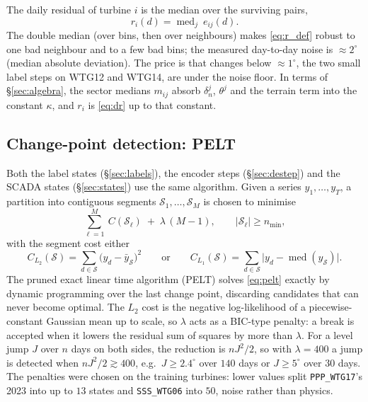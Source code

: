 \documentclass[11pt,a4paper]{article}
\theoremstyle{remark}
\newcommand{\med}{\operatorname{med}}
\newcommand{\dg}{^{\circ}}
\newcommand{\code}[1]{\texttt{#1}}
\begin{document}
The daily residual of turbine $i$ is the median over the surviving pairs,
\begin{equation}
  r_i(d) = \med_{j}\ e_{ij}(d) .
  \label{eq:r_def}
\end{equation}
The double median (over bins, then over neighbours) makes \eqref{eq:r_def}
robust to one bad neighbour and to a few bad bins; the measured day-to-day
noise is $\approx2\dg$ (median absolute deviation). The price is that changes
below $\approx1\dg$, the two small label steps on WTG12 and WTG14, are under the
noise floor. In terms of \S\ref{sec:algebra}, the sector medians $m_{ij}$
absorb $\delta_n^j$, $\theta^j$ and the terrain term into the constant $\kappa$,
and $r_i$ is \eqref{eq:dr} up to that constant.

\subsection{Change-point detection: PELT}\label{sec:pelt}
Both the label states (\S\ref{sec:labels}), the encoder steps
(\S\ref{sec:destep}) and the SCADA states (\S\ref{sec:states}) use the same
algorithm. Given a series $y_1,\dots,y_T$, a partition into contiguous segments
$\mathcal S_1,\dots,\mathcal S_M$ is chosen to minimise
\begin{equation}
  \sum_{\ell=1}^{M}\ C(\mathcal S_\ell) \;+\; \lambda\,(M-1),
  \qquad |\mathcal S_\ell| \ge n_{\min},
  \label{eq:pelt}
\end{equation}
with the segment cost either
\begin{equation}
  C_{L_2}(\mathcal S) = \sum_{d\in\mathcal S}\big(y_d - \bar y_{\mathcal S}\big)^2
  \qquad\text{or}\qquad
  C_{L_1}(\mathcal S) = \sum_{d\in\mathcal S}\big|y_d - \med(y_{\mathcal S})\big| .
\end{equation}
The pruned exact linear time algorithm (PELT) solves \eqref{eq:pelt} exactly by
dynamic programming over the last change point, discarding candidates that can
never become optimal. The $L_2$ cost is the negative log-likelihood of a
piecewise-constant Gaussian mean up to scale, so $\lambda$ acts as a BIC-type
penalty: a break is accepted when it lowers the residual sum of squares by more
than $\lambda$. For a level jump $J$ over $n$ days on both sides, the reduction
is $nJ^2/2$, so with $\lambda=400$ a jump is detected when $nJ^2/2\gtrsim400$,
e.g.\ $J\ge2.4\dg$ over $140$ days or $J\ge5\dg$ over $30$ days. The penalties
were chosen on the training turbines: lower values split
\code{PPP\_WTG17}'s 2023 into up to $13$ states and \code{SSS\_WTG06} into $50$,
noise rather than physics.
\end{document}
